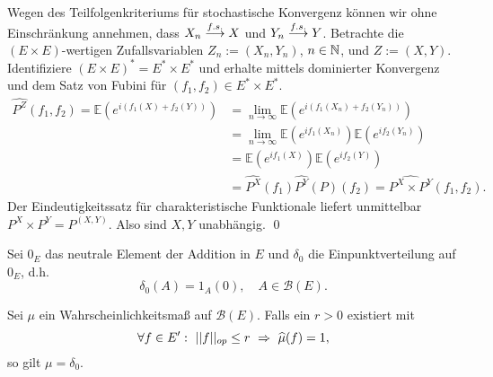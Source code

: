 \begin{proof*}%
    Wegen des Teilfolgenkriteriums für stochastische Konvergenz können wir ohne Einschränkung annehmen, dass $X_n \overset{f.s.}{\longrightarrow} X$ und $Y_n \overset{f.s.}{\longrightarrow} Y$. 
    Betrachte die $(E \times E)$-wertigen Zufallsvariablen $Z_n:=(X_n,Y_n)$, $n \in \mathbb{N}$, und $Z:=(X,Y)$. 
    Identifiziere $(E \times E)^* = E^* \times E^*$ und erhalte mittels dominierter Konvergenz und dem Satz von Fubini für $(f_1,f_2) \in E^* \times E^*$. 
    \begin{align*}
        \widehat{P^Z}(f_1,f_2) = \mathbb{E}(e^{i(f_1(X) + f_2(Y))}) &= \lim_{n \to \infty}\mathbb{E}(e^{i(f_1(X_n) + f_2(Y_n))})  \\\
                                                       &= \lim_{n \to \infty}\mathbb{E}(e^{if_1(X_n)})\mathbb{E}(e^{if_2(Y_n)}) \\\
                                                       &= \mathbb{E}(e^{if_1(X)})\mathbb{E}(e^{if_2(Y)})  \\\
                                                       &= \widehat{P^X}(f_1)\widehat{P^Y}(P)(f_2) = \widehat{P^X \times P^Y}(f_1, f_2).
    \end{align*}
    Der Eindeutigkeitssatz für charakteristische Funktionale liefert unmittelbar $P^X \times P^Y = P^{(X,Y)}$. Also sind $X,Y$ unabhängig. \qed
\end{proof*}

Sei $0_E$ das neutrale Element der Addition in $E$ und $\delta_0$ die Einpunktverteilung auf $0_E$, d.h. 
$$
    \delta_0(A) = 1_A(0), \quad A \in \mathcal{B}(E). 
$$

\begin{proposition}
    Sei $\mu$ ein Wahrscheinlichkeitsmaß auf $\mathcal{B}(E)$. Falls ein $r > 0$ existiert mit
    $$
       \forall f \in E': \  \lvert\lvert f \rvert\rvert_{op} \leq r \ \Rightarrow \ \widehat{\mu}(f) = 1,
    $$
    so gilt $\mu = \delta_0$. 
\end{proposition}

